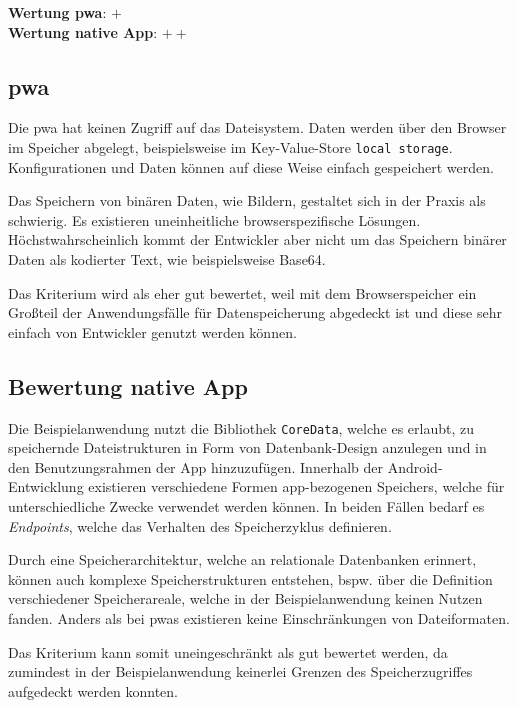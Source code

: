 \textbf{Wertung \ac{pwa}}: $+$\\
\textbf{Wertung native App}: $++$ \\

\subsection{\ac{pwa}}
Die \ac{pwa} hat keinen Zugriff auf das Dateisystem. Daten werden über den Browser im Speicher abgelegt, beispielsweise im Key-Value-Store \texttt{local storage}. Konfigurationen und Daten können auf diese Weise einfach gespeichert werden.

Das Speichern von binären Daten, wie Bildern, gestaltet sich in der Praxis als schwierig. Es existieren uneinheitliche browserspezifische Lösungen. Höchstwahrscheinlich kommt der Entwickler aber nicht um das Speichern binärer Daten als kodierter Text, wie beispielsweise Base64.

Das Kriterium wird als eher gut bewertet, weil mit dem Browserspeicher ein Großteil der Anwendungsfälle für Datenspeicherung abgedeckt ist und diese sehr einfach von Entwickler genutzt werden können.

\subsection{Bewertung native App}
Die Beispielanwendung nutzt die Bibliothek \texttt{CoreData}, welche es erlaubt, zu speichernde Dateistrukturen in Form von Datenbank-Design anzulegen und in den Benutzungsrahmen der App hinzuzufügen. Innerhalb der Android-Entwicklung existieren verschiedene Formen app-bezogenen Speichers, welche für unterschiedliche Zwecke verwendet werden können. In beiden Fällen bedarf es \textit{Endpoints}, welche das Verhalten des Speicherzyklus definieren.

Durch eine Speicherarchitektur, welche an relationale Datenbanken erinnert, können auch komplexe Speicherstrukturen entstehen, bspw. über die Definition verschiedener Speicherareale, welche in der Beispielanwendung keinen Nutzen fanden. Anders als bei \acp{pwa} existieren keine Einschränkungen von Dateiformaten.

Das Kriterium kann somit uneingeschränkt als gut bewertet werden, da zumindest in der Beispielanwendung keinerlei Grenzen des Speicherzugriffes aufgedeckt werden konnten.